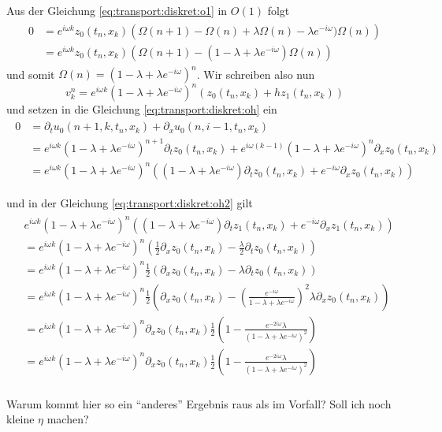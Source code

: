 Aus der Gleichung \eqref{eq:transport:diskret:o1} in $O(1)$ folgt
\begin{align} 
\begin{split}
0 &= e^{i \omega k} z_0(t_n, x_k) \left( \Omega(n+1) - \Omega(n) + \lambda \Omega(n) - \lambda e^{-i \omega}) \Omega(n) \right)\\
&= e^{i \omega k} z_0(t_n, x_k) \left(\Omega(n+1) - (1 - \lambda + \lambda e^{-i \omega}) \Omega(n) \right)
\end{split}
\end{align}
und somit $\Omega(n) = (1 - \lambda + \lambda e^{-i \omega})^n$. Wir schreiben also nun 
\[ 
v^n_k = e^{i \omega k} (1 - \lambda + \lambda e^{-i \omega})^n \left( z_0(t_n, x_k) + h z_1(t_n, x_k) \right)
\]
und setzen in die Gleichung \eqref{eq:transport:diskret:oh} ein
\begin{align}
\begin{split}
0 &= \partial_t u_0(n+1, k, t_n, x_k) + \partial_x u_0(n, i-1, t_n, x_k)\\
&= e^{i \omega k} (1 - \lambda + \lambda e^{-i \omega})^{n+1} \partial_t z_0(t_n, x_k) + e^{i \omega (k-1)} (1 - \lambda + \lambda e^{-i \omega})^n \partial_x z_0(t_n, x_k)\\
&= e^{i \omega k} (1 - \lambda + \lambda e^{-i \omega})^{n} \left( (1 - \lambda + \lambda e^{-i \omega}) \partial_t z_0(t_n, x_k) + e^{- i \omega} \partial_x z_0(t_n, x_k) \right)
\end{split}
\end{align}

und in der Gleichung \eqref{eq:transport:diskret:oh2} gilt
\begin{align}
\begin{split}
&e^{i \omega k} (1 - \lambda + \lambda e^{-i \omega})^{n} \left( (1 - \lambda + \lambda e^{-i \omega}) \partial_t z_1(t_n, x_k) + e^{- i \omega} \partial_x z_1(t_n, x_k) \right)\\
&= e^{i \omega k} (1 - \lambda + \lambda e^{-i \omega})^{n} \left( \frac{1}{2} \partial_x z_0(t_n, x_k) - \frac{\lambda}{2} \partial_t z_0(t_n, x_k) \right)\\
&= e^{i \omega k} (1 - \lambda + \lambda e^{-i \omega})^{n} \frac{1}{2} \left( \partial_x z_0(t_n, x_k) - \lambda \partial_t z_0(t_n, x_k) \right)\\
&= e^{i \omega k} (1 - \lambda + \lambda e^{-i \omega})^{n} \frac{1}{2} \left( \partial_x z_0(t_n, x_k) - \left( \frac{e^{- i \omega}}{1 - \lambda + \lambda e^{-i \omega}} \right)^2 \lambda \partial_x z_0(t_n, x_k) \right)\\
&= e^{i \omega k} (1 - \lambda + \lambda e^{-i \omega})^{n} \partial_x z_0(t_n, x_k) \frac{1}{2} \left( 1 - \frac{e^{- 2 i \omega} \lambda}{(1 - \lambda + \lambda e^{-i \omega})^2}  \right)\\
&= e^{i \omega k} (1 - \lambda + \lambda e^{-i \omega})^{n} \partial_x z_0(t_n, x_k) \frac{1}{2} \left( 1 - \frac{e^{- 2 i \omega} \lambda}{(1 - \lambda + \lambda e^{-i \omega})^2}  \right)\\
\end{split}
\end{align}

\begin{note}
Warum kommt hier so ein ``anderes'' Ergebnis raus als im Vorfall?
Soll ich noch kleine $\eta$ machen?
\end{note}
